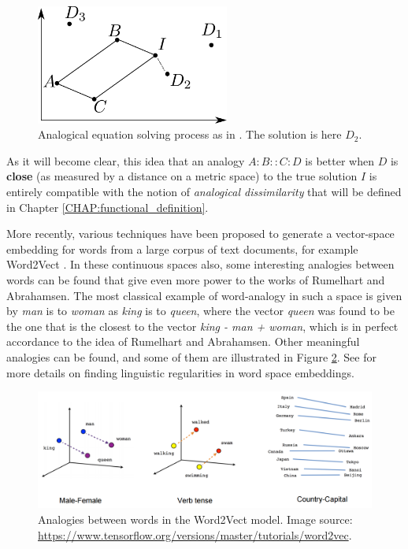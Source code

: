 \begin{figure}[!h]
\centering
\includegraphics[width=2.5in]{figures/rumelhart_model.pdf}
  \caption{Analogical equation solving process as in \cite{RumAbr73}. The
  solution is here $D_2$.}
\label{FIG:rumelhart_model}
\end{figure}

As it will become clear, this idea that an analogy $A:B::C:D$ is better when
$D$ is \textbf{close} (as measured by a distance on a metric space) to the true
solution $I$ is entirely compatible with the notion of \textit{analogical
dissimilarity} that will be defined in Chapter \ref{CHAP:functional_definition}.

More recently, various techniques have been proposed to generate a vector-space
embedding for words from a large corpus of text documents, for example
Word2Vect \cite{MikCheCorDea13}. In these continuous spaces also, some
interesting analogies between words can be found that give even more power to
the works of Rumelhart and Abrahamsen. The most classical example of
word-analogy in such a space is given by \textit{man} is to \textit{woman} as
\textit{king} is to \textit{queen}, where the vector
\textit{queen} was found to be the one that is the closest to the vector
\textit{king - man + woman}, which is in perfect accordance to the idea of
Rumelhart and Abrahamsen. Other meaningful analogies can be found, and some of
them are illustrated in Figure \ref{FIG:word_analogies}. See \cite{MikYihZwe13}
for more details on finding linguistic regularities in word space embeddings.
\begin{figure}[!h]
\centering
  \includegraphics[width=5in]{figures/word_analogies.png}
\caption{Analogies between words in the Word2Vect model. Image source:
  \url{https://www.tensorflow.org/versions/master/tutorials/word2vec}.}
  \label{FIG:word_analogies}
\end{figure}


